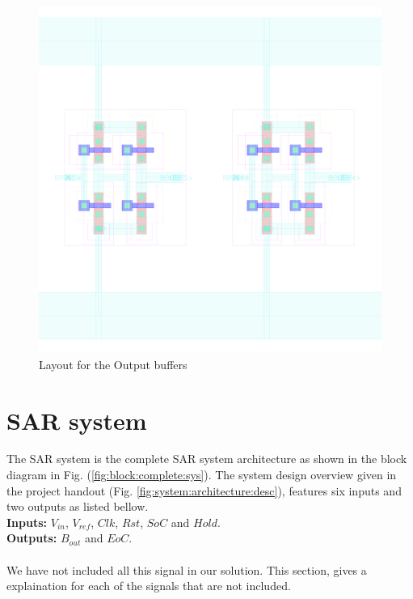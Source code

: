 \documentclass[english, 12pt, a4paper]{ifimaster}
\begin{document}
 \begin{figure}[!ht]
  \centering
  \includegraphics[width=\textwidth]{img/layout/bufferout_one}
  \caption{Layout for the Output buffers}
  \label{fig:layout:buff:out}
 \end{figure}

\section{SAR system}
The SAR system is the complete SAR system architecture as shown in the block diagram in Fig. (\ref{fig:block:complete:sys}).
The system design overview given in the project handout (Fig. \ref{fig:system:architecture:desc}),
features six inputs and two outputs as listed bellow.\\

\noindent \textbf{Inputs:} \(V_{in}\), \(V_{ref}\), \(Clk\), \(Rst\), \(SoC\) and \(Hold\).\\
\noindent \textbf{Outputs:} \(B_{out}\) and \(EoC\).\\
\\
We have not included all this signal in our solution. This section, gives a explaination for 
each of the signals that are not included. 
\end{document}
